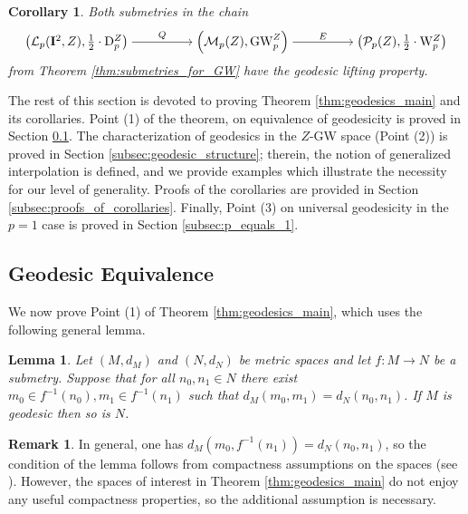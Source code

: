 \documentclass{article}
\newtheorem{lemma}[proposition]{Lemma}
\newtheorem{corollary}[proposition]{Corollary}
\theoremstyle{definition}
\newtheorem{remark}[proposition]{Remark}
\newcommand{\M}{\mathcal{M}}
\newcommand{\MZp}{\M_p(Z)}
\newcommand{\dgwz}{\mathrm{GW}_p^Z}
\newcommand{\WZ}{\mathcal{P}_p(Z)}
\newcommand{\wz}{\mathrm{W}_p^Z}
\newcommand{\Lp}{\mathcal{L}_p}
\newcommand{\dpz}{\mathrm{D}^Z_p}
\begin{document}
\begin{corollary}\label{cor:geodesic_lifting}
Both submetries in the chain 
    \[\begin{tikzcd}[ampersand replacement=\&,cramped]
	{\left(\Lp(\mathbf{I}^2,Z),\frac{1}{2} \cdot \dpz\right)} \&\& {\left(\MZp,\dgwz\right)} \&\& {\left(\WZ,\frac{1}{2} \cdot \wz\right)}
	\arrow["Q", from=1-1, to=1-3]
	\arrow["E", from=1-3, to=1-5]
\end{tikzcd}\]
from Theorem \ref{thm:submetries_for_GW} have the geodesic lifting property.
\end{corollary}

The rest of this section is devoted to proving Theorem \ref{thm:geodesics_main} and its corollaries. Point (1) of the theorem, on equivalence of geodesicity is proved in Section \ref{subsec:geodesic_equivalence}. The characterization of geodesics in the $Z$-GW space (Point (2)) is proved in Section \ref{subsec:geodesic_structure}; therein, the notion of generalized interpolation is defined, and we provide examples which illustrate the necessity for our level of generality. Proofs of the corollaries are provided in Section \ref{subsec:proofs_of_corollaries}. Finally, Point (3) on universal geodesicity in the $p=1$ case is proved in Section \ref{subsec:p_equals_1}.

\subsection{Geodesic Equivalence}\label{subsec:geodesic_equivalence}


We now prove Point (1) of Theorem \ref{thm:geodesics_main}, which uses the following general lemma.


\begin{lemma}\label{lem:submetries_and_geodesics}
  Let $(M,d_M)$ and $(N,d_N)$ be metric spaces and let $f:M \to N$ be a submetry.  Suppose that for all $n_0,n_1 \in N$ there exist $m_0 \in f^{-1}(n_0), m_1 \in f^{-1}(n_1)$ such that $d_M(m_0,m_1) = d_N(n_0,n_1)$. If $M$ is geodesic then so is $N$.
\end{lemma}

\begin{remark}
    In general, one has $d_M(m_0,f^{-1}(n_1)) = d_N(n_0, n_1)$, so the condition of the lemma follows from compactness assumptions on the spaces (see \cite[Lemma 2.1]{kapovitch2022structure}). However, the spaces of interest in Theorem \ref{thm:geodesics_main} do not enjoy any useful compactness properties, so the additional assumption is necessary.
\end{remark}
\end{document}
